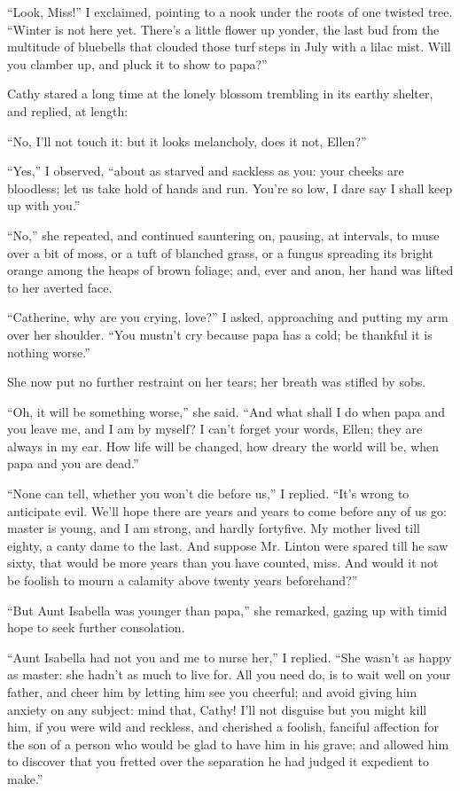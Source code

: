 \par “Look, Miss!” I exclaimed, pointing to a nook under the roots of one twisted tree. “Winter is not here yet. There's a little flower up yonder, the last bud from the multitude of bluebells that clouded those turf steps in July with a lilac mist. Will you clamber up, and pluck it to show to papa?”
\par Cathy stared a long time at the lonely blossom trembling in its earthy shelter, and replied, at length:
\par “No, I'll not touch it: but it looks melancholy, does it not, Ellen?”
\par “Yes,” I observed, “about as starved and sackless as you: your cheeks are bloodless; let us take hold of hands and run. You're so low, I dare say I shall keep up with you.”
\par “No,” she repeated, and continued sauntering on, pausing, at intervals, to muse over a bit of moss, or a tuft of blanched grass, or a fungus spreading its bright orange among the heaps of brown foliage; and, ever and anon, her hand was lifted to her averted face.
\par “Catherine, why are you crying, love?” I asked, approaching and putting my arm over her shoulder. “You mustn't cry because papa has a cold; be thankful it is nothing worse.”
\par She now put no further restraint on her tears; her breath was stifled by sobs.
\par “Oh, it will be something worse,” she said. “And what shall I do when papa and you leave me, and I am by myself? I can't forget your words, Ellen; they are always in my ear. How life will be changed, how dreary the world will be, when papa and you are dead.”
\par “None can tell, whether you won't die before us,” I replied. “It's wrong to anticipate evil. We'll hope there are years and years to come before any of us go: master is young, and I am strong, and hardly fortyfive. My mother lived till eighty, a canty dame to the last. And suppose Mr. Linton were spared till he saw sixty, that would be more years than you have counted, miss. And would it not be foolish to mourn a calamity above twenty years beforehand?”
\par “But Aunt Isabella was younger than papa,” she remarked, gazing up with timid hope to seek further consolation.
\par “Aunt Isabella had not you and me to nurse her,” I replied. “She wasn't as happy as master: she hadn't as much to live for. All you need do, is to wait well on your father, and cheer him by letting him see you cheerful; and avoid giving him anxiety on any subject: mind that, Cathy! I'll not disguise but you might kill him, if you were wild and reckless, and cherished a foolish, fanciful affection for the son of a person who would be glad to have him in his grave; and allowed him to discover that you fretted over the separation he had judged it expedient to make.”
